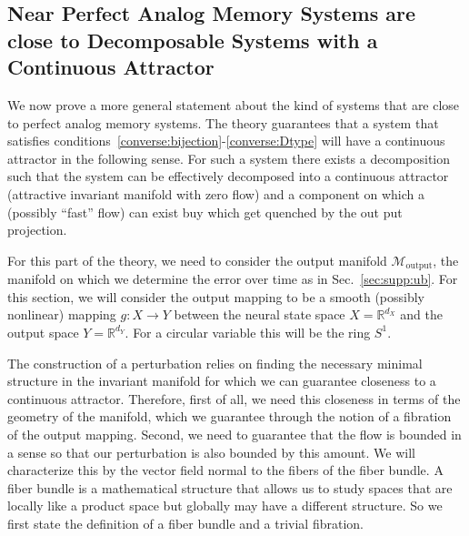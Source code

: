 \documentclass{article} %
\newcounter{ct}
\newcommand{\reals}{\mathbb{R}}
\newcommand{\manifold}{\mathcal{M}}
\theoremstyle{definition}
\theoremstyle{remark}
\begin{document}
\subsection{Near Perfect Analog Memory Systems are close to Decomposable Systems with a Continuous Attractor}\label{sec:near_ca}

We now prove a more general statement about the kind of systems that are close to perfect analog memory systems.
The theory guarantees that a system that satisfies conditions~\ref{converse:bijection}-\ref{converse:Dtype}  will have a continuous attractor in the following sense.
For such a system there exists a decomposition such that the system can be effectively decomposed into a continuous attractor (attractive invariant manifold with zero flow) and a component on which a (possibly ``fast'' flow) can exist buy which get quenched by the out put projection.

For this part of the theory, we need to consider the output manifold \(\manifold_{\text{output}}\), the manifold on which we determine the error over time as in Sec.~\ref{sec:supp:ub}.
For this section, we will consider the output mapping to be a smooth (possibly nonlinear) mapping \(g\colon X\rightarrow Y\) between the neural state space \(X=\reals^{d_{X}}\) and the output space \(Y=\reals^{d_{Y}}\).
For a circular variable this will be the ring \(S^{1}\).

The construction of a perturbation relies on finding the necessary minimal structure in the invariant manifold for which we can guarantee closeness to a continuous attractor.
Therefore, first of all, we need this closeness in terms of the geometry of the manifold, which we guarantee through the notion of a fibration of the output mapping.
Second, we need to guarantee that the flow is bounded in a sense so that our perturbation is also bounded by this amount.
We will characterize this by the vector field normal to the fibers of the fiber bundle.
A fiber bundle is a mathematical structure that allows us to study spaces that are locally like a product space but globally may have a different structure.
So we first state the definition of a fiber bundle and a trivial fibration.
\end{document}
